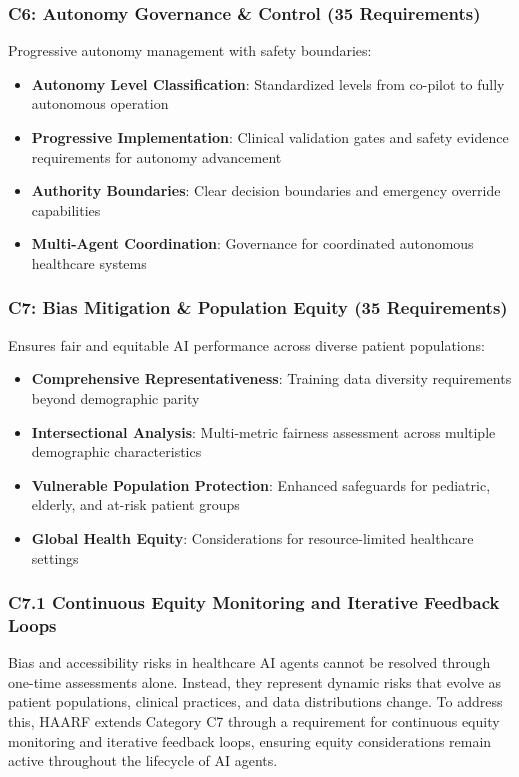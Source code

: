 \documentclass[11pt]{article}
\begin{document}
\subsubsection{C6: Autonomy Governance \& Control (35 Requirements)}

Progressive autonomy management with safety boundaries:

\begin{itemize}
    \item \textbf{Autonomy Level Classification}: Standardized levels from co-pilot to fully autonomous operation
    \item \textbf{Progressive Implementation}: Clinical validation gates and safety evidence requirements for autonomy advancement
    \item \textbf{Authority Boundaries}: Clear decision boundaries and emergency override capabilities
    \item \textbf{Multi-Agent Coordination}: Governance for coordinated autonomous healthcare systems
\end{itemize}

\subsubsection{C7: Bias Mitigation \& Population Equity (35 Requirements)}

Ensures fair and equitable AI performance across diverse patient populations:

\begin{itemize}
    \item \textbf{Comprehensive Representativeness}: Training data diversity requirements beyond demographic parity
    \item \textbf{Intersectional Analysis}: Multi-metric fairness assessment across multiple demographic characteristics
    \item \textbf{Vulnerable Population Protection}: Enhanced safeguards for pediatric, elderly, and at-risk patient groups
    \item \textbf{Global Health Equity}: Considerations for resource-limited healthcare settings
\end{itemize}

\subsubsection{C7.1 Continuous Equity Monitoring and Iterative Feedback Loops}

Bias and accessibility risks in healthcare AI agents cannot be resolved through one-time assessments alone. Instead, they represent dynamic risks that evolve as patient populations, clinical practices, and data distributions change. To address this, HAARF extends Category C7 through a requirement for continuous equity monitoring and iterative feedback loops, ensuring equity considerations remain active throughout the lifecycle of AI agents.
\end{document}
